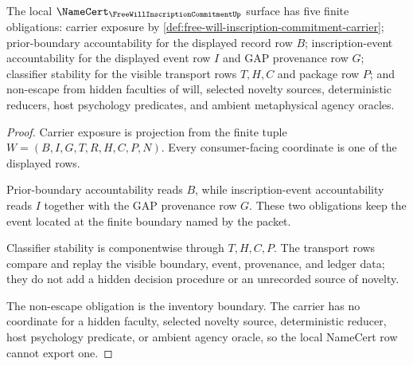 \begin{theorem}
\label{thm:free-will-inscription-commitment-namecert-obligations}
The local $\NameCert_{\FreeWillInscriptionCommitmentUp}$ surface has five finite obligations: carrier exposure by \autoref{def:free-will-inscription-commitment-carrier}; prior-boundary accountability for the displayed record row $B$; inscription-event accountability for the displayed event row $I$ and GAP provenance row $G$; classifier stability for the visible transport rows $T,H,C$ and package row $P$; and non-escape from hidden faculties of will, selected novelty sources, deterministic reducers, host psychology predicates, and ambient metaphysical agency oracles.
\end{theorem}
\begin{proof}
Carrier exposure is projection from the finite tuple $W=(B,I,G,T,R,H,C,P,N)$. Every consumer-facing coordinate is one of the displayed rows.

Prior-boundary accountability reads $B$, while inscription-event accountability reads $I$ together with the GAP provenance row $G$. These two obligations keep the event located at the finite boundary named by the packet.

Classifier stability is componentwise through $T,H,C,P$. The transport rows compare and replay the visible boundary, event, provenance, and ledger data; they do not add a hidden decision procedure or an unrecorded source of novelty.

The non-escape obligation is the inventory boundary. The carrier has no coordinate for a hidden faculty, selected novelty source, deterministic reducer, host psychology predicate, or ambient agency oracle, so the local NameCert row cannot export one.
\end{proof}

